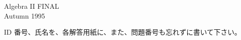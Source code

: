 


\newtheorem{thm}{定理}
\newcommand{\bZ}{\mbox{\boldmath $Z$}}
\newcommand{\bQ}{\mbox{\boldmath $Q$}}
\newcommand{\bR}{\mbox{\boldmath $R$}}
\newcommand{\bC}{\mbox{\boldmath $C$}}
\newcommand{\bigx}{{\large $\times$}}


\begin{center}
{\gt\LARGE Algebra II  FINAL}\\
{\gt Autumn 1995}
\end{center}

\noindent
ID 番号、氏名を、各解答用紙に、また、問題番号も忘れずに書いて下さい。

